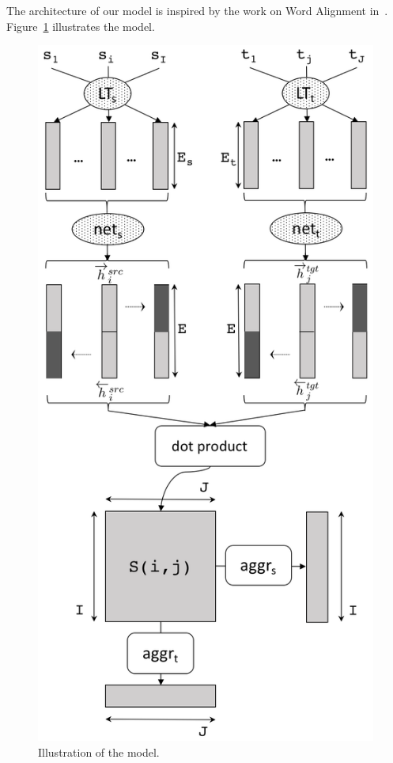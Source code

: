 \documentclass[11pt,a4paper]{article}
\begin{document}
The architecture of our model is inspired by the work on Word Alignment in~\cite{W16-2207}. Figure~\ref{network} illustrates the model.

\begin{figure}[h]
\center
    \includegraphics[width=0.8\linewidth]{network}
    \caption{Illustration of the model.} 
    \label{network}
\end{figure}
 
\end{document}
